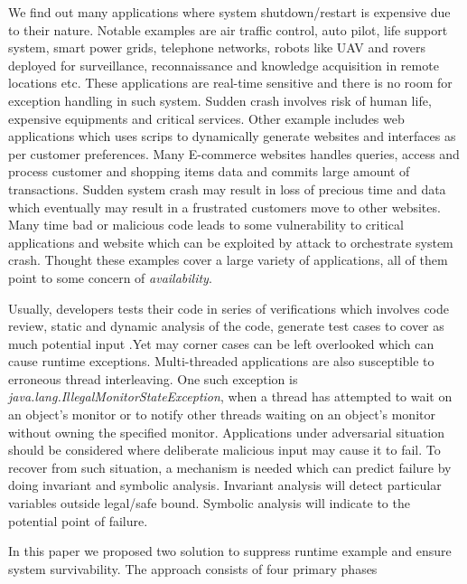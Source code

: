 We find out many applications where system shutdown/restart is expensive due to
their nature.
Notable examples are air traffic control, auto pilot, life support system, smart
power grids, telephone networks, robots like UAV and rovers deployed for
surveillance, reconnaissance and knowledge acquisition in remote locations etc.
These applications are real-time sensitive and there is no room for exception
handling in such system.
Sudden crash involves risk of human life, expensive equipments and critical
services.
Other example includes web applications which uses scrips to dynamically
generate websites and interfaces as per customer preferences.
Many E-commerce websites handles queries, access and process customer and
shopping items data and commits large amount of transactions.
Sudden system crash may result in loss of precious time and data which
eventually may result in a frustrated customers move to other websites.
Many time bad or malicious code leads to some vulnerability to critical
applications and website which can be exploited by attack to orchestrate system
crash. Thought these examples cover a large variety of applications, all of them
point to some concern of \emph{availability}.

Usually, developers tests their code in series of verifications which involves
code review, static and dynamic analysis of the code, generate test cases to
cover as much potential input .Yet may corner cases can be left overlooked which
can cause runtime exceptions.
Multi-threaded applications are also susceptible to erroneous thread
interleaving. One such exception is
\emph{java.lang.IllegalMonitorStateException}, when a thread has attempted to
wait on an object's monitor or to notify other threads waiting on an object's
monitor without owning the specified monitor. Applications under adversarial
situation should be considered where deliberate malicious input may cause it to
fail. To recover from such situation, a mechanism is needed which can predict
failure by doing invariant and symbolic analysis. Invariant analysis will detect
particular variables outside legal/safe bound. Symbolic analysis will indicate
to the potential point of failure.


In this paper we proposed two solution to suppress runtime example and ensure
system survivability. The approach consists of four primary phases

